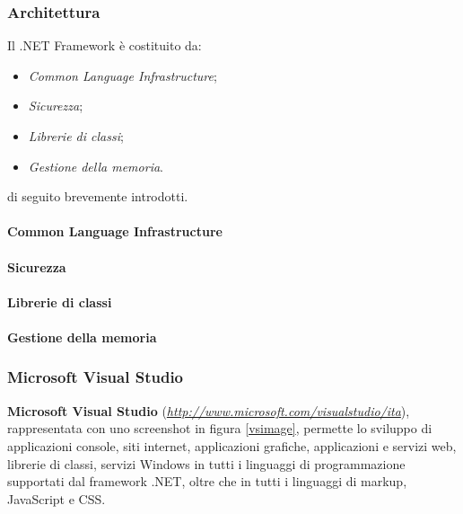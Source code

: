 \subsubsection{Architettura}
Il .NET Framework è costituito da:
\begin{itemize}
\item \emph{Common Language Infrastructure};
\item \emph{Sicurezza};
\item \emph{Librerie di classi};
\item \emph{Gestione della memoria}.
\end{itemize}
di seguito brevemente introdotti.
\paragraph{Common Language Infrastructure}
\paragraph{Sicurezza}
\paragraph{Librerie di classi}
\paragraph{Gestione della memoria}




\subsubsection{Microsoft Visual Studio}
\textbf{Microsoft Visual Studio} (\emph{\url{http://www.microsoft.com/visualstudio/ita}}), rappresentata con uno screenshot in figura \ref{vsimage}, permette lo sviluppo di applicazioni console, siti internet, applicazioni grafiche, applicazioni e servizi web, librerie di classi, servizi Windows in tutti i linguaggi di programmazione supportati dal framework .NET, oltre che in tutti i linguaggi di markup, JavaScript e CSS.

